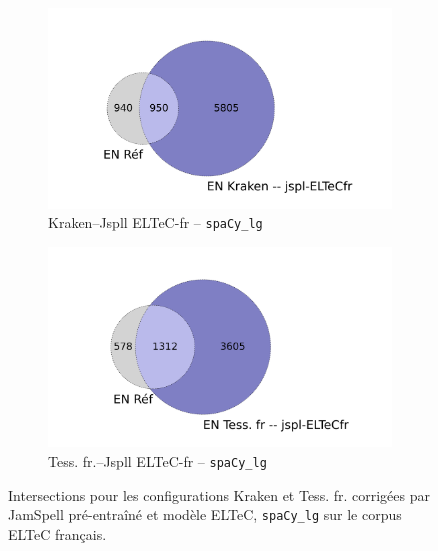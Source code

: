 \begin{figure}[h!]
\begin{minipage}{6.5cm}
  \begin{subfigure}{1\textwidth}
  \includegraphics[width=1\textwidth]{IMAGES/INTERSECTIONS_GLOBALES/ELTeCFRA_Kraken -- jspl-ELTeCfr_spacy-lg-concat_intersection.png} 
  \caption{Kraken--Jspll ELTeC-fr -- \texttt{spaCy\_lg}}
  \label{fig:ELTeCFRA_Kraken -- jspl-ELTeCfr_spacy-lg-concat_intersection}
  \end{subfigure}
  \end{minipage}
  \begin{minipage}{6.5cm}
  \begin{subfigure}{1\textwidth}
  \includegraphics[width=1\textwidth]{IMAGES/INTERSECTIONS_GLOBALES/ELTeCFRA_Tess. fr -- jspl-ELTeCfr_spacy-lg-concat_intersection.png} %
  \caption{Tess. fr.--Jspll ELTeC-fr -- \texttt{spaCy\_lg}}
  \label{fig:ELTeCFRA_Tess -- jspl-ELTeCFR_spacy-lg-concat_intersection}
  \end{subfigure}
    \end{minipage}
\caption{Intersections pour les configurations Kraken et Tess. fr. corrigées par JamSpell pré-entraîné et modèle ELTeC, \texttt{spaCy\_lg} sur le corpus ELTeC français.}
\label{fig:intersection_globale-kraken}
\end{figure}

